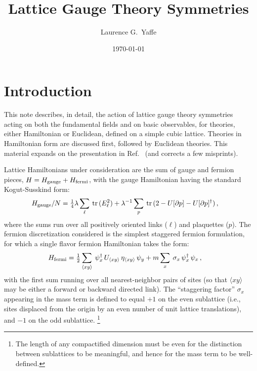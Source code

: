 \documentclass [12pt]{article}
\title
    {
    Lattice Gauge Theory Symmetries
    \vspace*{-8pt}
    }
\date	{\small\today\vspace*{-30pt}}
\author	{Laurence G.~Yaffe}
\affil{%
    \small
    Department of Physics, University of Washington, Seattle WA 98195, USA
    \vspace*{-12pt}
    }%
\newcommand{\tr}{\mathop{\mathrm{tr}}}
\begin{document}
\maketitle
\tableofcontents
\setlength{\parskip}{5pt plus 2pt minus 1pt}

\section{Introduction}

This note describes, in detail, the action of lattice gauge theory symmetries
acting on both the fundamental fields and on basic observables,
for theories, either Hamiltonian or Euclidean, defined on a simple cubic lattice.
Theories in Hamiltonian form are discussed first, followed by 
Euclidean theories.
This material expands on the presentation in Ref.~\cite{CSVAII}
(and corrects a few misprints).

Lattice Hamiltonians under consideration are the sum of
gauge and fermion pieces,
$
    H = H_{\rm gauge} + H_{\rm fermi}
$,
with the gauge Hamiltonian having the standard Kogut-Susskind form:
\begin{align}
    H_{\rm gauge}/N
    &=
    \tfrac 14 \lambda \sum_\ell \> \tr \, (E_\ell^2)
    + \lambda^{-1} \sum_p \> \tr\, (2 - U[\partial p] - U[\partial p]^\dagger) \,,
\label{eq:Hgauge}
\end{align}
where the sums run over all positively oriented links ($\ell$) and plaquettes ($p$).
The fermion discretization considered is the simplest staggered fermion formulation,
for which a single flavor fermion Hamiltonian takes the form:
\begin{align}
    H_{\rm fermi}
    &=
    \tfrac 12 \sum_{\langle xy \rangle} \>
    \psi^\dagger_x \, U_{\langle xy \rangle} \, \eta_{\langle xy \rangle} \, \psi_y
    + m \sum_x \> \sigma_x \, \psi^\dagger_x \, \psi_x \,,
\label{eq:Hfermi}
\end{align}
with the first sum running over all nearest-neighbor pairs of sites
(so that $\langle xy \rangle$ may be either a forward or backward directed link).
The ``staggering factor'' $\sigma_x$ appearing in the mass term is defined to equal
$+1$ on the even sublattice (i.e., sites displaced from the origin by an even
number of unit lattice translations), and $-1$ on the odd sublattice.%
\footnote
    {%
    The length of any compactified dimension must be even
    for the distinction between sublattices to be meaningful,
    and hence for the mass term to be well-defined.
    }
\end{document}
